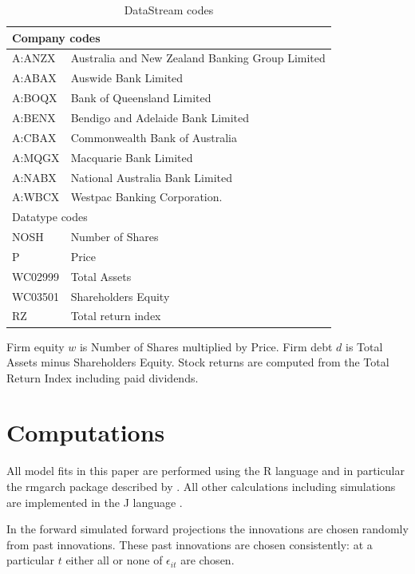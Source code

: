 \documentclass[12pt]{article}
\newcommand{\eps}{\epsilon}
\begin{document}
\begin{table}\caption{DataStream codes}\label{datastream}
\begin{center}
	\begin{tabular}{l|l}
	\hline
	\multicolumn{2}{l}{Company codes}\\
	\hline
A:ANZX & Australia and New Zealand Banking Group Limited\\
A:ABAX & Auswide Bank Limited\\
A:BOQX & Bank of Queensland Limited\\
A:BENX & Bendigo and Adelaide Bank Limited\\
A:CBAX & Commonwealth Bank of Australia\\
A:MQGX & Macquarie Bank Limited\\
A:NABX & National Australia Bank Limited\\
A:WBCX & Westpac Banking Corporation.\\
\hline
\multicolumn{2}{l}{Datatype codes}\\
\hline
	NOSH & Number of Shares\\
	P & Price\\
	WC02999 & Total Assets\\
	WC03501 & Shareholders Equity\\
	RZ & Total return index\\
\hline	
\end{tabular}
\end{center}
\end{table}

Firm equity $w$ is Number of Shares multiplied by Price. Firm debt $d$ is Total Assets minus Shareholders Equity. Stock returns are computed from the Total Return Index including paid dividends. 

\section{Computations}

All model fits in this paper are performed using the R language \citep{R-Development-Core-Team:2008aa} and in particular the rmgarch package described by \cite{ghalanos2012rmgarch}.  All other calculations including simulations are implemented in the J language \citep{iverson2003j}.

In the forward simulated forward projections the  innovations are chosen randomly from past innovations.   These past innovations are chosen consistently:  at a particular $t$ either all or none of $\eps_{it}$ are chosen.


\end{document}
